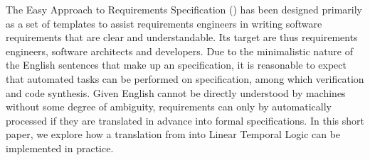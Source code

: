 The Easy Approach to Requirements Specification (\ears) has been designed
primarily as a set of templates to assist requirements engineers in writing
software requirements that are clear and understandable.
Its target are thus requirements engineers, software architects and developers.
Due to the minimalistic nature of the English sentences that make up an \ears
specification, it is reasonable to expect that automated tasks can be performed
on \ears specification, among which verification and code synthesis. Given
English cannot be directly understood by machines without some degree of
ambiguity, \ears requirements can only by automatically processed if they are
translated in advance into formal specifications. In this short paper, we
explore how a translation from \ears into Linear Temporal Logic can be
implemented in practice.